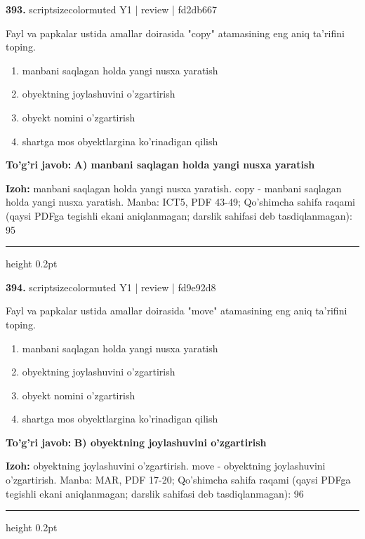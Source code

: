 \documentclass[10pt,a4paper]{article}
\begin{document}
{\bfseries\sffamily\color{ink} 393.} {scriptsizecolor{muted} Y1 | review | fd2db667}
\par
Fayl va papkalar ustida amallar doirasida "copy" atamasining eng aniq ta'rifini toping.
\begin{enumerate}[label=\Alph*),leftmargin=9mm]
\item manbani saqlagan holda yangi nusxa yaratish
\item obyektning joylashuvini o'zgartirish
\item obyekt nomini o'zgartirish
\item shartga mos obyektlargina ko'rinadigan qilish
\end{enumerate}
\begin{tcolorbox}[enhanced,breakable,colback=teal!4,colframe=teal!60!black,boxrule=0.45pt,arc=1.2mm,left=2.7mm,right=2.7mm,top=1.8mm,bottom=1.8mm,before skip=2mm,after skip=2mm]
{\bfseries\sffamily\color{teal}To'g'ri javob:} \textbf{A) manbani saqlagan holda yangi nusxa yaratish}
\par\smallskip
{\bfseries Izoh:} manbani saqlagan holda yangi nusxa yaratish. copy - manbani saqlagan holda yangi nusxa yaratish. Manba: ICT5, PDF 43-49; Qo'shimcha sahifa raqami (qaysi PDFga tegishli ekani aniqlanmagan; darslik sahifasi deb tasdiqlanmagan): 95
\end{tcolorbox}
\vspace{2mm}\hrule height 0.2pt\vspace{3mm}

{\bfseries\sffamily\color{ink} 394.} {scriptsizecolor{muted} Y1 | review | fd9e92d8}
\par
Fayl va papkalar ustida amallar doirasida "move" atamasining eng aniq ta'rifini toping.
\begin{enumerate}[label=\Alph*),leftmargin=9mm]
\item manbani saqlagan holda yangi nusxa yaratish
\item obyektning joylashuvini o'zgartirish
\item obyekt nomini o'zgartirish
\item shartga mos obyektlargina ko'rinadigan qilish
\end{enumerate}
\begin{tcolorbox}[enhanced,breakable,colback=teal!4,colframe=teal!60!black,boxrule=0.45pt,arc=1.2mm,left=2.7mm,right=2.7mm,top=1.8mm,bottom=1.8mm,before skip=2mm,after skip=2mm]
{\bfseries\sffamily\color{teal}To'g'ri javob:} \textbf{B) obyektning joylashuvini o'zgartirish}
\par\smallskip
{\bfseries Izoh:} obyektning joylashuvini o'zgartirish. move - obyektning joylashuvini o'zgartirish. Manba: MAR, PDF 17-20; Qo'shimcha sahifa raqami (qaysi PDFga tegishli ekani aniqlanmagan; darslik sahifasi deb tasdiqlanmagan): 96
\end{tcolorbox}
\vspace{2mm}\hrule height 0.2pt\vspace{3mm}
\end{document}
